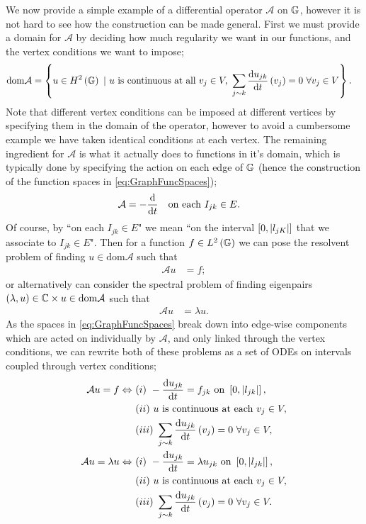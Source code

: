 We now provide a simple example of a differential operator $\mathcal{A}$ on $\mathbb{G}$, however it is not hard to see how the construction can be made general.
First we must provide a domain for $\mathcal{A}$ by deciding how much regularity we want in our functions, and the vertex conditions we want to impose;
\begin{align*}
	\mathrm{dom}\mathcal{A} &= \clbracs{ u\in H^2\bracs{\graph} \ \vert \ u \text{ is continuous at all } v_j\in V, \ \sum_{j\con k}\diff{u_{jk}}{t}\bracs{v_j} = 0 \ \forall v_j\in V}.
\end{align*}
Note that different vertex conditions can be imposed at different vertices by specifying them in the domain of the operator, however to avoid a cumbersome example we have taken identical conditions at each vertex.
The remaining ingredient for $\mathcal{A}$ is what it actually does to functions in it's domain, which is typically done by specifying the action on each edge of $\mathbb{G}$ (hence the construction of the function spaces in \eqref{eq:GraphFuncSpaces});
\begin{align*}
	\mathcal{A} &= -\dfrac{\mathrm{d}}{\mathrm{d}t} \quad\text{on each } I_{jk}\in E.
\end{align*}
Of course, by ``on each $I_{jk}\in E$" we mean ``on the interval $\left[ 0,\left\lvert l_{jK} \right\rvert \right]$ that we associate to $I_{jk}\in E$".
Then for a function $f\in L^2\left( \mathbb{G} \right)$ we can pose the resolvent problem of finding $u\in\mathrm{dom}\mathcal{A}$ such that
\begin{align*}
	\mathcal{A}u &= f;
\end{align*}
or alternatively can consider the spectral problem of finding eigenpairs $\left( \lambda,u \right)\in\mathbb{C}\times u\in\mathrm{dom}\mathcal{A}$ such that
\begin{align*}
	\mathcal{A}u &= \lambda u.
\end{align*}
As the spaces in \eqref{eq:GraphFuncSpaces} break down into edge-wise components which are acted on individually by $\mathcal{A}$, and only linked through the vertex conditions, we can rewrite both of these problems as a set of ODEs on intervals coupled through vertex conditions;
\begin{align*}
	\mathcal{A}u = f \Leftrightarrow \
	& (i) \ -\diff{u_{jk}}{t} = f_{jk} \ \text{on } \interval{l_{jk}}, \\
	& (ii) \ u \text{ is continuous at each } v_j\in V, \\
	& (iii) \ \sum_{j\con k}\diff{u_{jk}}{t}\bracs{v_j} = 0 \ \forall v_j\in V, \\
	\mathcal{A}u = \lambda u \Leftrightarrow \
	& (i) \ -\diff{u_{jk}}{t} = \lambda u_{jk} \ \text{on } \interval{l_{jk}}, \\
	& (ii) \ u \text{ is continuous at each } v_j\in V, \\
	& (iii) \ \sum_{j\con k}\diff{u_{jk}}{t}\bracs{v_j} = 0 \ \forall v_j\in V.
\end{align*}

